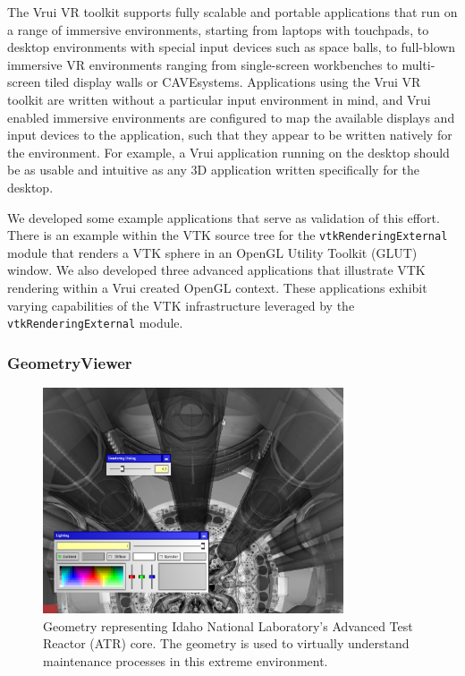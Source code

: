 The Vrui VR toolkit supports fully scalable and portable applications that run on a range of immersive environments, starting from laptops with touchpads, to desktop environments with special input devices such as space balls, to full-blown immersive VR environments ranging from single-screen workbenches to multi-screen tiled display walls or CAVE\texttrademark systems. Applications using the Vrui VR toolkit are written without a particular input environment in mind, and Vrui enabled immersive environments are configured to map the available displays and input devices to the application, such that they appear to be written natively for the environment. For example, a Vrui application running on the desktop should be as usable and intuitive as any 3D application written specifically for the desktop.

We developed some example applications that serve as validation of this effort. There is an example within the VTK source tree for the \texttt{vtkRenderingExternal} module that renders a VTK sphere in an OpenGL Utility Toolkit (GLUT) window. We also developed three advanced applications that illustrate VTK rendering within a Vrui created OpenGL context. These applications exhibit varying capabilities of the VTK infrastructure leveraged by the \texttt{vtkRenderingExternal} module. 

\subsubsection{GeometryViewer}

\begin{figure}[h!]
 \centering
 \includegraphics[width=3.5in]{images/vessel.png}
 \caption{Geometry representing Idaho National Laboratory's Advanced Test Reactor (ATR) core. The geometry is used to virtually understand maintenance processes in this extreme environment.}
 \label{fig:vessel}
\end{figure}

